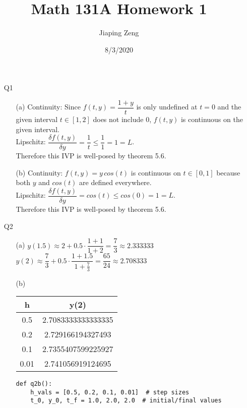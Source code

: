\documentclass{article}
\title{Math 131A Homework 1}
\date{8/3/2020}
\author{Jiaping Zeng}
\begin{document}
\maketitle

\begin{itemize}
    \item [Q1]
          \begin{itemize}
              \item [(a)] Continuity: Since $f(t,y)=\dfrac{1+y}{t}$ is only undefined at $t=0$ and the given interval $t\in[1,2]$ does not include $0$, $f(t,y)$ is continuous on the given interval.\\Lipschitz: $\dfrac{\delta f(t,y)}{\delta y}=\dfrac{1}{t}\leq\dfrac{1}{1}=1=L$.\\Therefore this IVP is well-posed by theorem 5.6.
              \item [(b)] Continuity: $f(t,y)=y\,cos(t)$ is continuous on $t\in[0,1]$ because both $y$ and $cos(t)$ are defined everywhere.\\Lipschitz: $\dfrac{\delta f(t,y)}{\delta y}=cos(t)\leq cos(0)=1=L$.\\Therefore this IVP is well-posed by theorem 5.6.
          \end{itemize}
    \item [Q2]
          \begin{itemize}
              \item [(a)] $y(1.5)\approx 2+0.5\cdot\dfrac{1+1}{1+2}=\dfrac{7}{3}\approx 2.333333$\\$y(2)\approx \dfrac{7}{3}+0.5\cdot\dfrac{1+1.5}{1+\frac{7}{3}}=\boxed{\dfrac{65}{24}}\approx 2.708333$
              \item [(b)]
                    \begin{tabular}{|c|c|}
                        \hline
                        h    & y(2)               \\
                        \hline
                        0.5  & 2.7083333333333335 \\
                        \hline
                        0.2  & 2.729166194327493  \\
                        \hline
                        0.1  & 2.7355407599225927 \\
                        \hline
                        0.01 & 2.741056919124695  \\
                        \hline
                    \end{tabular}
                    \begin{verbatim}
def q2b():
    h_vals = [0.5, 0.2, 0.1, 0.01]  # step sizes
    t_0, y_0, t_f = 1.0, 2.0, 2.0  # initial/final values


\end{verbatim}
\end{itemize}
\end{itemize}
\end{document}
